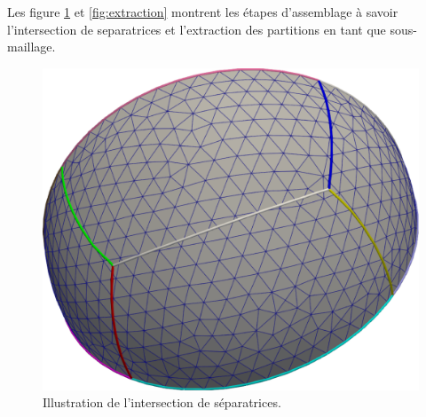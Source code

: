 Les figure \ref{fig:intersection_space} et \ref{fig:extraction} montrent les étapes d'assemblage à savoir l'intersection de separatrices et l'extraction des partitions en tant que sous- maillage.

\begin{figure}[!h]
  \centering
  \includegraphics[scale=0.235]{images/intersection_space.pdf}
  \caption{Illustration de l'intersection de séparatrices.}
  \label{fig:intersection_space}
\end{figure}

